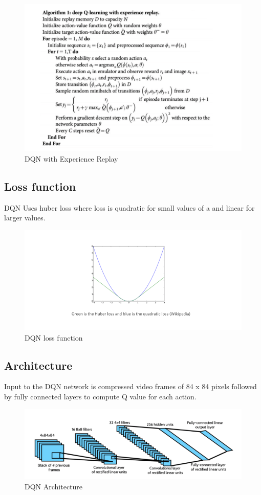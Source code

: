 \begin{figure}%
\centering
\includegraphics[width=0.6\columnwidth]{figures/DQN-ExperinceReplay.png}%
\caption{DQN with Experience Replay}%
\label{fig:datastats}%
\end{figure}


\subsection{Loss function}


DQN Uses huber loss where loss is quadratic for small values of a and linear for larger values.


\begin{figure}%
\centering
\includegraphics[width=0.6\columnwidth]{figures/loss-function.png}%
\caption{DQN loss function}%
\label{fig:datastats}%
\end{figure}


\subsection{Architecture}

Input to the DQN network is compressed video frames of 84 x 84 pixels followed by fully connected layers to compute Q value for each action.

\begin{figure}%
\centering
\includegraphics[width=0.6\columnwidth]{figures/DQN-architecture.png}%
\caption{DQN Architecture}%
\label{fig:datastats}%
\end{figure}



